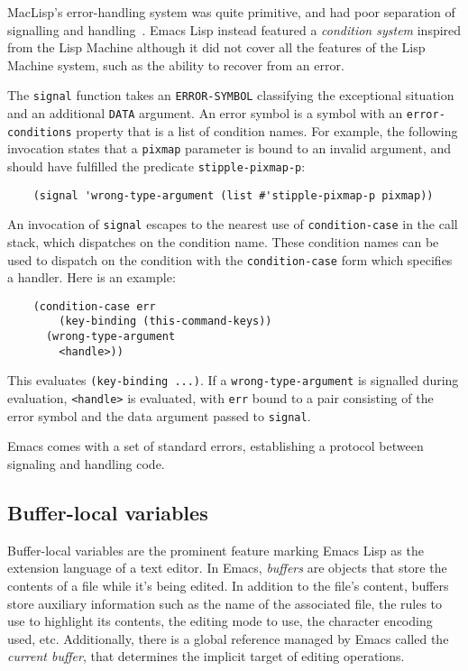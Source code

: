 \documentclass[format=acmsmall, review]{acmart}
\newcommand \Elisp {Emacs Lisp}
\begin{document}
MacLisp's error-handling system was quite primitive, and had poor separation
of signalling and handling~\cite{Pitman2001}.  \Elisp{} instead featured
a \emph{condition system} inspired from the Lisp Machine although it did
not cover all the features of the Lisp Machine system, such as the ability
to recover from an error.

The \texttt{signal} function takes an \texttt{ERROR-SYMBOL} classifying the
exceptional situation and an additional \texttt{DATA} argument.  An error
symbol is a symbol with an \texttt{error-conditions} property that is a list
of condition names.  For example, the following invocation states that
a \texttt{pixmap} parameter is bound to an invalid argument, and
should have fulfilled the predicate \texttt{stipple-pixmap-p}:
\begin{verbatim}
    (signal 'wrong-type-argument (list #'stipple-pixmap-p pixmap))
\end{verbatim}
An invocation of \texttt{signal} escapes to the nearest
use of \texttt{condition-case} in the call stack, which dispatches on the
condition name.
These condition names can be used to dispatch on the condition with
the \texttt{condition-case} form which specifies a handler.
Here is an example:
\begin{verbatim}
    (condition-case err
        (key-binding (this-command-keys))
      (wrong-type-argument
        <handle>))
\end{verbatim}
This evaluates \texttt{(key-binding ...)}.  If a
\texttt{wrong-type-argument} is signalled during evaluation,
\texttt{<handle>} is evaluated, with \texttt{err} bound to a pair
consisting of the error symbol and the data argument passed to
\texttt{signal}.

Emacs comes with a set of standard errors, establishing a protocol
between signaling and handling code.

\subsection{Buffer-local variables}
\label{sec:buffer-local-variables}

Buffer-local variables are the prominent feature marking \Elisp{} as the
extension language of a text editor.  In Emacs, \emph{buffers} are objects
that store the contents of a file while it's being edited.  In addition to
the file's content, buffers store auxiliary information such
as the name of the associated file, the rules to use to highlight its
contents, the editing mode to use, the character encoding used, etc.
Additionally, there is a global reference managed by Emacs called the
\emph{current buffer}, that determines the implicit target of
editing operations.
\end{document}
